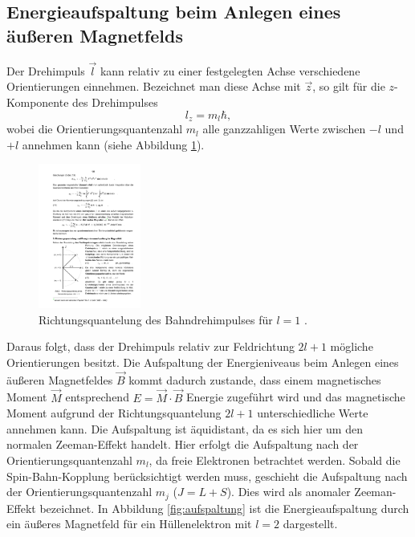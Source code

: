 \subsection{Energieaufspaltung beim Anlegen eines äußeren Magnetfelds}
Der Drehimpuls $\vec{l}$ kann relativ zu einer festgelegten Achse verschiedene Orientierungen einnehmen. Bezeichnet man diese Achse mit $\vec{z}$, so gilt für die $z$-Komponente des Drehimpulses
\begin{equation}
  l_z=m_l\hbar,
\end{equation}
wobei die Orientierungsquantenzahl $m_l$ alle ganzzahligen Werte zwischen $-l$ und $+l$ annehmen kann (siehe Abbildung  \ref{fig:richtungl}).
\begin{figure}
	\centering
  \includegraphics[width=0.3\textwidth] {bilder/richtungl.pdf}
	\caption{Richtungsquantelung des Bahndrehimpulses für $l=1$ \cite{anleitung28}.}
	\label{fig:richtungl}
\end{figure}
Daraus folgt, dass der Drehimpuls relativ zur Feldrichtung $2l+1$ mögliche Orientierungen besitzt.
Die Aufspaltung der Energieniveaus beim Anlegen eines äußeren Magnetfeldes $\vec{B}$ kommt dadurch zustande, dass einem magnetisches Moment $\vec{M}$ entsprechend $E=\vec{M}\cdot\vec{B}$ Energie zugeführt wird und das magnetische Moment aufgrund der Richtungsquantelung $2l+1$ unterschiedliche Werte annehmen kann. Die Aufspaltung ist äquidistant, da es sich hier um den normalen Zeeman-Effekt handelt. Hier erfolgt die Aufspaltung nach der Orientierungsquantenzahl $m_l$, da freie Elektronen betrachtet werden. Sobald die Spin-Bahn-Kopplung berücksichtigt werden muss, geschieht die Aufspaltung nach der Orientierungsquantenzahl $m_j$ ($J=L+S$). Dies wird als anomaler Zeeman-Effekt bezeichnet. In Abbildung \ref{fig:aufspaltung} ist die Energieaufspaltung durch ein äußeres Magnetfeld für ein Hüllenelektron mit $l=2$ dargestellt.
